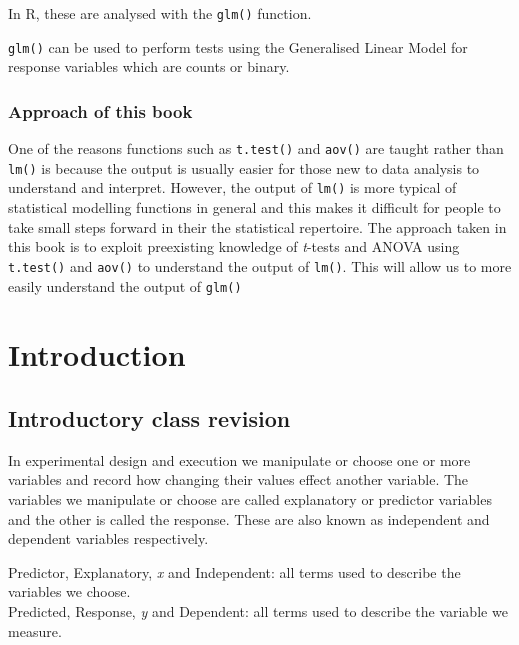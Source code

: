 \documentclass[
]{book}
\begin{document}
In R, these are analysed with the \texttt{glm()} function.

\begin{key}

\texttt{glm()} can be used to perform tests using the Generalised Linear Model for response variables which are counts or binary.

\end{key}

\hypertarget{approach-of-this-book}{%
\section{Approach of this book}\label{approach-of-this-book}}

One of the reasons functions such as \texttt{t.test()} and \texttt{aov()} are taught rather than \texttt{lm()} is because the output is usually easier for those new to data analysis to understand and interpret. However, the output of \texttt{lm()} is more typical of statistical modelling functions in general and this makes it difficult for people to take small steps forward in their the statistical repertoire. The approach taken in this book is to exploit preexisting knowledge of \emph{t}-tests and ANOVA using \texttt{t.test()} and \texttt{aov()} to understand the output of \texttt{lm()}. This will allow us to more easily understand the output of \texttt{glm()}

\hypertarget{part-introduction}{%
\part{Introduction}\label{part-introduction}}

\hypertarget{introductory-class-revision}{%
\chapter{Introductory class revision}\label{introductory-class-revision}}

In experimental design and execution we manipulate or choose one or more variables and record how changing their values effect another variable. The variables we manipulate or choose are called explanatory or predictor variables and the other is called the response. These are also known as independent and dependent variables respectively.

\begin{key}

Predictor, Explanatory, \emph{x} and Independent: all terms used to describe the variables we choose.\\
Predicted, Response, \emph{y} and Dependent: all terms used to describe the variable we measure.

\end{key}
\end{document}
